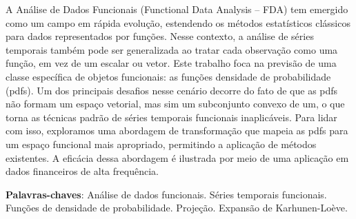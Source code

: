 \documentclass[
	12pt,				%
	oneside,			%
	a4paper,			%
	english,			%
	brazil				%
	]{abntex2ppgsi}
\begin{document}

\setlength{\absparsep}{18pt} %
\begin{resumo}

% 
%
% 
%

A Análise de Dados Funcionais (Functional Data Analysis – FDA) tem emergido como um campo em rápida evolução, estendendo os métodos estatísticos clássicos para dados representados por funções. Nesse contexto, a análise de séries temporais também pode ser generalizada ao tratar cada observação como uma função, em vez de um escalar ou vetor. Este trabalho foca na previsão de uma classe específica de objetos funcionais: as funções densidade de probabilidade (pdfs). Um dos principais desafios nesse cenário decorre do fato de que as pdfs não formam um espaço vetorial, mas sim um subconjunto convexo de um, o que torna as técnicas padrão de séries temporais funcionais inaplicáveis. Para lidar com isso, exploramos uma abordagem de transformação que mapeia as pdfs para um espaço funcional mais apropriado, permitindo a aplicação de métodos existentes. A eficácia dessa abordagem é ilustrada por meio de uma aplicação em dados financeiros de alta frequência.

\textbf{Palavras-chaves}: Análise de dados funcionais. Séries temporais funcionais. Funções de densidade de probabilidade. Projeção. Expansão de Karhunen-Loève. 
\end{resumo}
\end{document}
